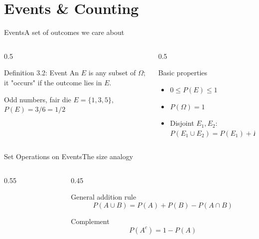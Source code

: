 \documentclass[aspectratio=169,11pt]{beamer}
\begin{document}
\section{Events \& Counting}

\begin{frame}{Events}{A set of outcomes we care about}
  \begin{columns}[T]
    \begin{column}{0.5\textwidth}
      \begin{block}{Definition 3.2: Event}
        \small An  $E$ is any subset of $\Omega$;
        it "occurs" if the outcome lies in $E$.
      \end{block}
      \begin{exampleblock}{Odd numbers, fair die}
        \small $E = \{1,3,5\}$, $P(E) = 3/6 = 1/2$
      \end{exampleblock}
    \end{column}
    \begin{column}{0.5\textwidth}
      \begin{block}{Basic properties}
        \small
        \begin{itemize}
          \item $0 \le P(E) \le 1$
          \item $P(\Omega) = 1$
          \item Disjoint $E_1, E_2$: $P(E_1 \cup E_2) = P(E_1)+P(E_2)$
        \end{itemize}
      \end{block}
    \end{column}
  \end{columns}
\end{frame}

\begin{frame}{Set Operations on Events}{The size analogy}
  \begin{columns}[T]
    \begin{column}{0.55\textwidth}
      \begin{center}
      \end{center}
    \end{column}
    \begin{column}{0.45\textwidth}
      \begin{block}{General addition rule}
        \[ P(A\cup B) = P(A)+P(B)-P(A\cap B) \]
      \end{block}
      \begin{exampleblock}{Complement}
        \[ P(A^c) = 1 - P(A) \]
      \end{exampleblock}
    \end{column}
  \end{columns}
\end{frame}
\end{document}
